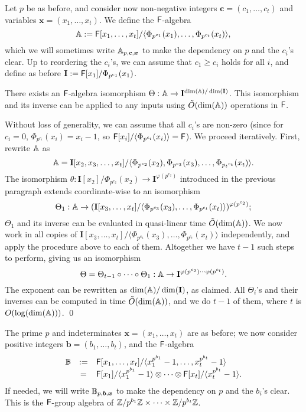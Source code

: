 \smallskip{}
Let $p$ be as before, and consider now non-negative integers
$\boldsymbol{c}=(c_1,\dots,c_t)$ and variables $\boldsymbol{x}=(x_1,\dots,x_t)$. We
define the ${\mathsf{F}}$-algebra
$$\mathbb{A}:={\mathsf{F}}[x_1,\dots,x_t]/\langle \Phi_{p^{c_1}}(x_1), \dots,
\Phi_{p^{c_t}}(x_t)\rangle,$$ which we will sometimes write
$\mathbb{A}_{p,\boldsymbol{c},\boldsymbol{x}}$ to make the dependency on $p$
and the $c_i$'s clear. Up to reordering the $c_i$'s, we can assume
that $c_1 \ge c_i$ holds for all $i$, and define as before
$\mathbf{I}:={\mathsf{F}}[x_1]/\Phi_{p^{c_1}}(x_1)$.

\begin{lemma}\label{lemma:A}
  There exists an ${\mathsf{F}}$-algebra isomorphism $\Theta: \mathbb{A} \to
  \mathbf{I}^{\dim(\mathbb{A})/\dim(\mathbf{I})}$. This isomorphism and its
  inverse can be applied to any inputs using $\tilde{O}(\dim(\mathbb{A}))$
  operations in ${\mathsf{F}}$.
\end{lemma}
Without loss of generality, we can assume that all $c_i$'s are non-zero
(since for $c_i=0$, $\Phi_{p^{c_i}}(x_i)=x_i-1$,
so ${\mathsf{F}}[x_i]/\langle \Phi_{p^{c_i}}(x_i) \rangle = {\mathsf{F}}$).
We proceed iteratively. First, rewrite $\mathbb{A}$ as
$$\mathbb{A}=\mathbf{I}[x_2,x_3,\dots,x_t]/\langle \Phi_{p^{c_2}}(x_2), \Phi_{p^{c_3}}(x_3), \dots,
\Phi_{{p_t}^{c_t}}(x_t)\rangle.$$ 
The isomorphism 
$\theta: \mathbf{I}[x_2]/\Phi_{p^{c_2}}(x_2) \to \mathbf{I}^{\varphi(p^{c_2})}$
introduced in the previous paragraph extends coordinate-wise
to an isomorphism 
$$\Theta_1: \mathbb{A} \to (\mathbf{I}[x_3,\dots,x_t]/\langle
\Phi_{p^{c_3}}(x_3), \dots,
\Phi_{p^{c_t}}(x_t)\rangle)^{\varphi(p^{c_2})};$$ $\Theta_1$ and its
inverse can be evaluated in quasi-linear time $\tilde{O}(\dim(\mathbb{A}))$.
We now work in all copies of $\mathbf{I}[x_3,\dots,x_t]/\langle
\Phi_{p^{c_3}}(x_3), \dots, \Phi_{p^{c_t}}(x_t)\rangle$ independently,
and apply the procedure above to each of them. Altogether we have
$t-1$ such steps to perform, giving us an isomorphism
$$\Theta = \Theta_{t-1} \circ \cdots \circ \Theta_1:
\mathbb{A} \to
\mathbf{I}^{\varphi(p^{c_2}) \cdots \varphi(p^{c_t})}.$$
The exponent can be rewritten as $ \dim(\mathbb{A})/\dim(\mathbf{I})$, as claimed.
All $\Theta_i$'s and their inverses can be computed
in time $\tilde{O}(\dim(\mathbb{A}))$, and we do $t-1$ of them,
where $t$ is $O(\log(\dim(\mathbb{A})))$. 
\qed

  The prime $p$
and indeterminates $\boldsymbol{x}=(x_1,\dots,x_t)$ are as before; we now consider
positive integers $\boldsymbol{b}=(b_1,\dots,b_t)$, and the ${\mathsf{F}}$-algebra
\[
\begin{array}{ccl}
\B&:=&\F[x_1,\dots,x_t]/\langle x_1^{p^{b_1}}-1,\dots,x_t^{p^{b_t}}-1\rangle\\$$
&=& \F[x_1]/\langle x_1^{p^{b_1}}-1 \rangle \otimes \cdots \otimes \F[x_t]/\langle x_t^{p^{b_t}}-1 \rangle.
\end{array}
\]
If needed, we will write $\mathbb{B}_{p,\boldsymbol{b},\boldsymbol{x}}$ to make the dependency
on $p$ and the $b_i$'s clear. This is the ${\mathsf{F}}$-group algebra
of $\mathbb{Z}/p^{b_1}\mathbb{Z} \times \cdots \times \mathbb{Z}/p^{b_t}\mathbb{Z}$.

